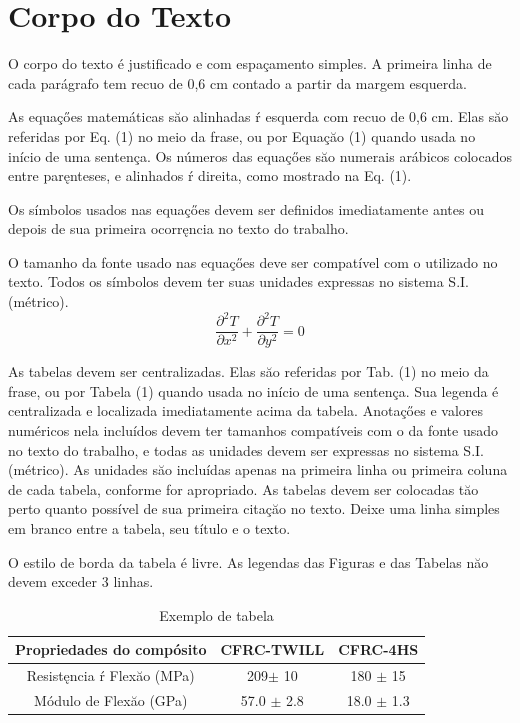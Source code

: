 \documentclass{ufscThesis}
\begin{document}
\section{Corpo do Texto}
O corpo do texto é justificado e com espaçamento simples. A primeira linha de cada parágrafo tem recuo de 0,6 cm contado a partir da margem esquerda.

As equaçőes matemáticas săo alinhadas ŕ esquerda com recuo de 0,6 cm.  Elas săo referidas por Eq. (1) no meio da frase, ou por Equaçăo (1) quando usada no início de uma sentença. Os números das equaçőes săo numerais arábicos colocados entre paręnteses, e alinhados ŕ direita, como mostrado na Eq. (1).

Os símbolos usados nas equaçőes devem ser definidos imediatamente antes ou depois de sua primeira ocorręncia no texto do trabalho.

O tamanho da fonte usado nas equaçőes deve ser compatível com o utilizado no texto. Todos os símbolos devem ter suas unidades expressas no sistema S.I. (métrico).
\begin{equation}
\frac{\partial ^2 T}{\partial x^2} + \frac{\partial ^2 T}{\partial y^2} =0
\end{equation}

As tabelas devem ser centralizadas. Elas săo referidas por Tab. (1) no meio da frase, ou por Tabela (1) quando usada no início de uma sentença. Sua legenda é centralizada e localizada imediatamente acima da tabela. Anotaçőes e valores numéricos nela incluídos devem ter tamanhos compatíveis com o da fonte usado no texto do trabalho, e todas as unidades devem ser expressas no sistema S.I. (métrico). As unidades săo incluídas apenas na primeira linha ou primeira coluna de cada tabela, conforme for apropriado. As tabelas devem ser colocadas tăo perto quanto possível de sua primeira citaçăo no texto. Deixe uma linha simples em branco entre a tabela, seu título e o texto.

O estilo de borda da tabela é livre. As legendas das Figuras e das Tabelas năo devem exceder 3 linhas.

\begin{table}[h]
\begin{center}
\caption{Exemplo de tabela}
\begin{tabular}{c|c|c}
\hline
Propriedades do compósito & CFRC-TWILL & CFRC-4HS\\
\hline
Resistęncia ŕ Flexăo (MPa) & 209$\pm$ 10 & 180 $\pm$  15\\
\hline
Módulo de Flexăo  (GPa) & 57.0 $\pm$ 2.8 & 18.0 $\pm$  1.3\\
\hline
\end{tabular}
\end{center}
\end{table}
\end{document}
